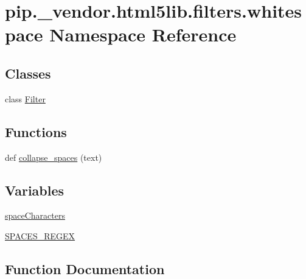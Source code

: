 \hypertarget{namespacepip_1_1__vendor_1_1html5lib_1_1filters_1_1whitespace}{}\section{pip.\+\_\+vendor.\+html5lib.\+filters.\+whitespace Namespace Reference}
\label{namespacepip_1_1__vendor_1_1html5lib_1_1filters_1_1whitespace}
\subsection*{Classes}
\begin{DoxyCompactItemize}
\item 
class \hyperlink{classpip_1_1__vendor_1_1html5lib_1_1filters_1_1whitespace_1_1Filter}{Filter}
\end{DoxyCompactItemize}
\subsection*{Functions}
\begin{DoxyCompactItemize}
\item 
def \hyperlink{namespacepip_1_1__vendor_1_1html5lib_1_1filters_1_1whitespace_af67758db23ae694d12045f90c12978ea}{collapse\+\_\+spaces} (text)
\end{DoxyCompactItemize}
\subsection*{Variables}
\begin{DoxyCompactItemize}
\item 
\hyperlink{namespacepip_1_1__vendor_1_1html5lib_1_1filters_1_1whitespace_acb0efc0c5461a148842aab0bb1c39fd9}{space\+Characters}
\item 
\hyperlink{namespacepip_1_1__vendor_1_1html5lib_1_1filters_1_1whitespace_a43ca195e95f0243ae94b6903caea70e2}{S\+P\+A\+C\+E\+S\+\_\+\+R\+E\+G\+EX}
\end{DoxyCompactItemize}


\subsection{Function Documentation}
\mbox{\label{namespacepip_1_1__vendor_1_1html5lib_1_1filters_1_1whitespace_af67758db23ae694d12045f90c12978ea}} 
